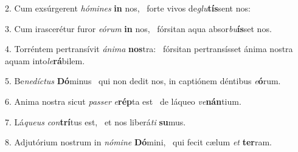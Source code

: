 2. Cum exsúrgerent \textit{hó}\textit{mi}\textit{nes} \textbf{in} nos, \ast\  forte vivos de\textit{glu}\textbf{tís}sent nos:\

3. Cum irascerétur furor \textit{e}\textit{ó}\textit{rum} \textbf{in} nos, \ast\  fórsitan aqua absor\textit{bu}\textbf{ís}set nos.\

4. Torréntem pertransívit \textit{á}\textit{ni}\textit{ma} \textbf{nos}tra: \ast\  fórsitan pertransísset ánima nostra aquam into\textit{le}\textbf{rá}bilem.\

5. Be\textit{ne}\textit{díc}\textit{tus} \textbf{Dó}minus \ast\  qui non dedit nos, in captiónem déntibus \textit{e}\textbf{ó}rum.\

6. Anima nostra sicut \textit{pas}\textit{ser} \textit{e}\textbf{rép}ta est \ast\  de láqueo \textit{ve}\textbf{nán}tium.\

7. Lá\textit{que}\textit{us} \textit{con}\textbf{trí}tus est, \ast\  et nos liberá\textit{ti} \textbf{su}mus.\

8. Adjutórium nostrum in \textit{nó}\textit{mi}\textit{ne} \textbf{Dó}mini, \ast\  qui fecit cælum \textit{et} \textbf{ter}ram.\

